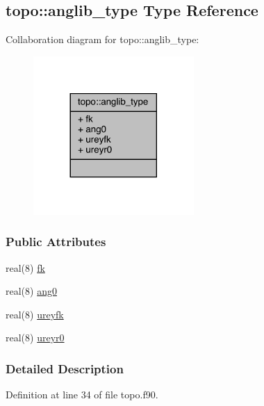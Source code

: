 \hypertarget{structtopo_1_1anglib__type}{\subsection{topo\-:\-:anglib\-\_\-type Type Reference}
\label{structtopo_1_1anglib__type}
}


Collaboration diagram for topo\-:\-:anglib\-\_\-type\-:
\nopagebreak
\begin{figure}[H]
\begin{center}
\leavevmode
\includegraphics[width=173pt]{structtopo_1_1anglib__type__coll__graph}
\end{center}
\end{figure}
\subsubsection*{Public Attributes}
\begin{DoxyCompactItemize}
\item 
real(8) \hyperlink{structtopo_1_1anglib__type_a2148b48d4ddb73d38c0abf5e49f141fb}{fk}
\item 
real(8) \hyperlink{structtopo_1_1anglib__type_acdca474c4c1c2bca5d41138c221c4fbc}{ang0}
\item 
real(8) \hyperlink{structtopo_1_1anglib__type_a727cb2498aae93ce7560fafd3abbe12e}{ureyfk}
\item 
real(8) \hyperlink{structtopo_1_1anglib__type_aba95dd259df01f5547b0759a9607d9e1}{ureyr0}
\end{DoxyCompactItemize}


\subsubsection{Detailed Description}


Definition at line 34 of file topo.\-f90.



